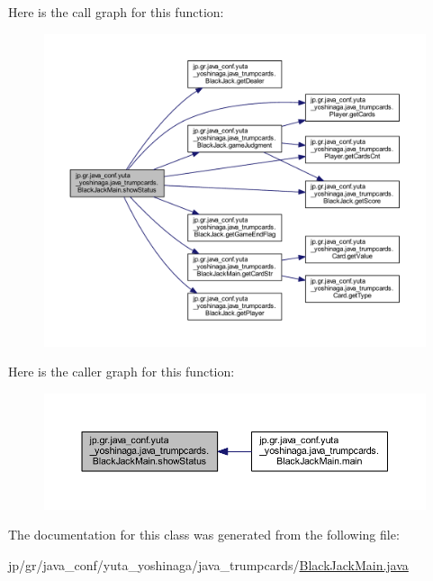 Here is the call graph for this function\+:
\nopagebreak
\begin{figure}[H]
\begin{center}
\leavevmode
\includegraphics[width=350pt]{classjp_1_1gr_1_1java__conf_1_1yuta__yoshinaga_1_1java__trumpcards_1_1_black_jack_main_aefaaf9d1dfc330af971cb1a167a9e8d9_cgraph}
\end{center}
\end{figure}
Here is the caller graph for this function\+:
\nopagebreak
\begin{figure}[H]
\begin{center}
\leavevmode
\includegraphics[width=350pt]{classjp_1_1gr_1_1java__conf_1_1yuta__yoshinaga_1_1java__trumpcards_1_1_black_jack_main_aefaaf9d1dfc330af971cb1a167a9e8d9_icgraph}
\end{center}
\end{figure}


The documentation for this class was generated from the following file\+:\begin{DoxyCompactItemize}
\item 
jp/gr/java\+\_\+conf/yuta\+\_\+yoshinaga/java\+\_\+trumpcards/\hyperlink{_black_jack_main_8java}{Black\+Jack\+Main.\+java}\end{DoxyCompactItemize}
